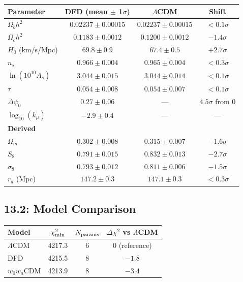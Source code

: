 \documentclass[11pt,a4paper]{article}
\begin{document}
\begin{center}
\begin{longtable}{lccc}
\toprule
\textbf{Parameter} & \textbf{DFD (mean $\pm$ 1$\sigma$)} & \textbf{$\Lambda$CDM} & \textbf{Shift} \\
\midrule
$\Omega_b h^2$ & $0.02237 \pm 0.00015$ & $0.02237 \pm 0.00015$ & $< 0.1\sigma$ \\
$\Omega_c h^2$ & $0.1183 \pm 0.0012$ & $0.1200 \pm 0.0012$ & $-1.4\sigma$ \\
$H_0$ (km/s/Mpc) & $69.8 \pm 0.9$ & $67.4 \pm 0.5$ & $+2.7\sigma$ \\
$n_s$ & $0.966 \pm 0.004$ & $0.965 \pm 0.004$ & $< 0.3\sigma$ \\
$\ln(10^{10} A_s)$ & $3.044 \pm 0.015$ & $3.044 \pm 0.014$ & $< 0.1\sigma$ \\
$\tau$ & $0.054 \pm 0.008$ & $0.054 \pm 0.007$ & $< 0.1\sigma$ \\
$\Delta\psi_0$ & $0.27 \pm 0.06$ & --- & $4.5\sigma$ from 0 \\
$\log_{10}(k_\mu)$ & $-2.9 \pm 0.4$ & --- & --- \\
\midrule
\textbf{Derived} & & & \\
$\Omega_m$ & $0.302 \pm 0.008$ & $0.315 \pm 0.007$ & $-1.6\sigma$ \\
$S_8$ & $0.791 \pm 0.015$ & $0.832 \pm 0.013$ & $-2.7\sigma$ \\
$\sigma_8$ & $0.793 \pm 0.012$ & $0.811 \pm 0.006$ & $-1.5\sigma$ \\
$r_d$ (Mpc) & $147.2 \pm 0.3$ & $147.1 \pm 0.3$ & $< 0.3\sigma$ \\
\bottomrule
\end{longtable}
\end{center}

\subsection{13.2: Model Comparison}

\begin{center}
\begin{tabular}{lccc}
\toprule
\textbf{Model} & \textbf{$\chi^2_{\rm min}$} & \textbf{$N_{\rm params}$} & \textbf{$\Delta\chi^2$ vs $\Lambda$CDM} \\
\midrule
$\Lambda$CDM & 4217.3 & 6 & 0 (reference) \\
DFD & 4215.5 & 8 & $-1.8$ \\
$w_0 w_a$CDM & 4213.9 & 8 & $-3.4$ \\
\bottomrule
\end{tabular}
\end{center}
\end{document}
